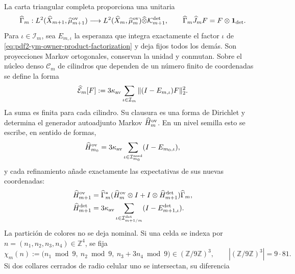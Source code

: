 La carta triangular completa proporciona una unitaria
\begin{equation}\label{eq:pdf2-ym-owner-triangular-unitary}
 \widehat\Gamma_m:
 L^2(\widehat X_{m+1},\widehat\mu_{m+1}^{\rm ov})
 \longrightarrow
 L^2(\widehat X_m,\widehat\mu_m^{\rm ov})
 \widehat\otimes\mathcal K_{m+1}^{\rm det},
 \qquad
 \widehat\Gamma_m\widehat J_mF=F\otimes\mathbf1_{\rm det}.
\end{equation}
Para $\iota\in\mathcal I_m$, sea $E_{m,\iota}$ la esperanza que integra
exactamente el factor $\iota$ de
\eqref{eq:pdf2-ym-owner-product-factorization} y deja fijos todos los demás.
Son proyecciones Markov ortogonales, conservan la unidad y conmutan. Sobre el
núcleo denso $\mathscr C_m$ de cilindros que dependen de un número finito de
coordenadas se define la forma
\begin{equation}\label{eq:pdf2-ym-owner-full-form}
 \widehat{\mathcal E}_m[F]
 :=3\kappa_{\rm av}\sum_{\iota\in\mathcal I_m}
   \|(I-E_{m,\iota})F\|_2^2.
\end{equation}
La suma es finita para cada cilindro. Su clausura es una forma de Dirichlet y
determina el generador autoadjunto Markov
$\widehat H_m^{\rm ov}$. En un nivel semilla esto se escribe, en sentido de
formas,
\begin{equation}\label{eq:pdf2-ym-owner-base-generator}
 \widehat H_{m_0}^{\rm ov}
 =3\kappa_{\rm av}
  \sum_{\iota\in\mathcal I_{m_0}^{\rm seed}}(I-E_{m_0,\iota}),
\end{equation}
y cada refinamiento añade exactamente las expectativas de sus nuevas coordenadas:
\begin{equation}\label{eq:pdf2-ym-owner-refined-generator}
 \begin{aligned}
 \widehat H_{m+1}^{\rm ov}
 &=\widehat\Gamma_m^*
   (\widehat H_m^{\rm ov}\otimes I
    +I\otimes\widehat H_{m+1}^{\rm det})\widehat\Gamma_m,\\
 \widehat H_{m+1}^{\rm det}
 &=3\kappa_{\rm av}
   \sum_{\iota\in\mathcal I_{m+1/m}^{\rm det}}
   (I-E_{m+1,\iota}^{\rm det}).
 \end{aligned}
\end{equation}
La partición de colores no se deja nominal. Si una celda se indexa por
$n=(n_1,n_2,n_3,n_4)\in\mathbb Z^4$, se fija
\begin{equation}\label{eq:pdf2-ym-owner-729-coloring}
 \chi_m(n):=
 \bigl(n_1\bmod9,\ n_2\bmod9,\ n_3+3n_4\bmod9\bigr)
 \in(\mathbb Z/9\mathbb Z)^3,
 \qquad |(\mathbb Z/9\mathbb Z)^3|=9\cdot81.
\end{equation}
Si dos collares cerrados de radio celular uno se intersectan, su diferencia
